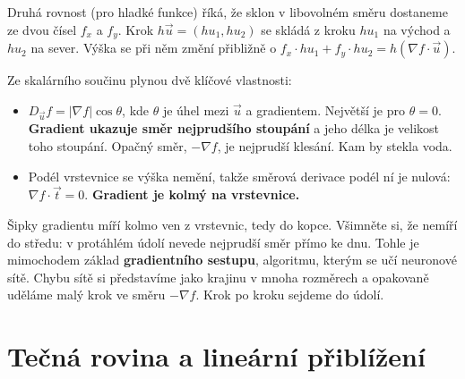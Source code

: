 Druhá rovnost (pro hladké funkce) říká, že sklon v libovolném směru dostaneme ze dvou čísel $f_x$ a $f_y$. Krok $h\vec{u} = (hu_1, hu_2)$ se skládá z kroku $hu_1$ na východ a $hu_2$ na sever. Výška se při něm změní přibližně o $f_x\cdot hu_1 + f_y\cdot hu_2 = h(\nabla f\cdot\vec{u})$.

Ze skalárního součinu plynou dvě klíčové vlastnosti:
\begin{itemize}
  \item $D_{\vec{u}}f = |\nabla f|\cos\theta$, kde $\theta$ je úhel mezi $\vec{u}$ a gradientem. Největší je pro $\theta = 0$. \textbf{Gradient ukazuje směr nejprudšího stoupání} a jeho délka je velikost toho stoupání. Opačný směr, $-\nabla f$, je nejprudší klesání. Kam by stekla voda.
  \item Podél vrstevnice se výška nemění, takže směrová derivace podél ní je nulová: $\nabla f\cdot\vec{t} = 0$. \textbf{Gradient je kolmý na vrstevnice.}
\end{itemize}

\begin{center}
\end{center}

Šipky gradientu míří kolmo ven z vrstevnic, tedy do kopce. Všimněte si, že nemíří do středu: v protáhlém údolí nevede nejprudší směr přímo ke dnu. Tohle je mimochodem základ \textbf{gradientního sestupu}, algoritmu, kterým se učí neuronové sítě. Chybu sítě si představíme jako krajinu v mnoha rozměrech a opakovaně uděláme malý krok ve směru $-\nabla f$. Krok po kroku sejdeme do údolí.

\section{Tečná rovina a lineární přiblížení}

